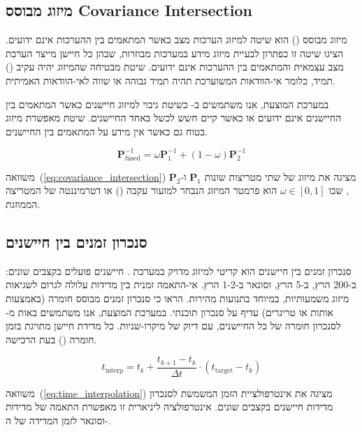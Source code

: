 \subsection{מיזוג מבוסס Covariance Intersection}
\label{sec:covariance_intersection}

מיזוג מבוסס  () הוא שיטה למיזוג הערכות מצב כאשר המתאמים בין ההערכות אינם ידועים. \citet{Julier1997CovarianceIntersection} הציגו שיטה זו כפתרון לבעיית מיזוג מידע במערכות מבוזרות, שבהן כל חיישן מייצר הערכת מצב עצמאית והמתאמים בין ההערכות אינם ידועים. שיטת  מבטיחה שהמיזוג יהיה עקיב () תמיד, כלומר אי-הוודאות המשוערכת תהיה תמיד גבוהה או שווה לאי-הוודאות האמיתית.

במערכת המוצעת, אנו משתמשים ב- כשיטת גיבוי למיזוג חיישנים כאשר המתאמים בין החיישנים אינם ידועים או כאשר קיים חשש לכשל באחד החיישנים. שיטת  מאפשרת מיזוג בטוח גם כאשר אין מידע על המתאמים בין החיישנים.

\begin{equation}
\mathbf{P}_{\text{fused}}^{-1} = \omega \mathbf{P}_{1}^{-1} + (1 - \omega) \mathbf{P}_{2}^{-1}
\label{eq:covariance_intersection}
\end{equation}

משוואה~(\ref{eq:covariance_intersection}) מציגה את מיזוג  של שתי מטריצות שונות $\mathbf{P}_1$ ו-$\mathbf{P}_2$, שבו $\omega \in [0, 1]$ הוא פרמטר המיזוג הנבחר למזעור עקבה () או דטרמיננטה של המטריצה הממוזגת.

\subsection{סנכרון זמנים בין חיישנים}
\label{sec:temporal_sync}

סנכרון זמנים בין חיישנים הוא קריטי למיזוג מדויק במערכת . חיישנים פועלים בקצבים שונים:  ב-200 הרץ,  ב-5 הרץ, וסונאר ב-1-2 הרץ. אי-התאמה זמנית בין מדידות עלולה לגרום לשגיאות מיזוג משמעותיות, במיוחד בתנועות מהירות. \citet{Kaess2012} הראו כי סנכרון זמנים מבוסס חומרה (באמצעות אותות  או טריגרים) עדיף על סנכרון תוכנתי. במערכת המוצעת, אנו משתמשים באות  מ- לסנכרון חומרה של כל החיישנים, עם דיוק של מיקרו-שניות. כל מדידת חיישן מתויגת בזמן חומרה () בעת הרכישה.

\begin{equation}
t_{\text{interp}} = t_k + \frac{t_{k+1} - t_k}{\Delta t} \cdot (t_{\text{target}} - t_k)
\label{eq:time_interpolation}
\end{equation}

משוואה~(\ref{eq:time_interpolation}) מציגה את אינטרפולציית הזמן המשמשת לסנכרון מדידות חיישנים בקצבים שונים. אינטרפולציה ליניארית זו מאפשרת התאמה של מדידות  וסונאר לזמן המדידה של ה-.
